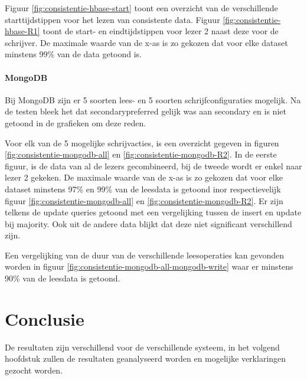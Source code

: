 Figuur \ref{fig:consistentie-hbase-start} toont een overzicht van de verschillende starttijdstippen voor het lezen van consistente data. Figuur \ref{fig:consistentie-hbase-R1} toont de start- en eindtijdstippen voor lezer 2 naast deze voor de schrijver. De maximale waarde van de x-as is zo gekozen dat voor elke dataset minstens 99\% van de data getoond is. 



\paragraph{MongoDB} Bij MongoDB zijn er 5 soorten lees- en 5 soorten schrijfconfiguraties mogelijk. Na de testen bleek het dat secondarypreferred gelijk was aan secondary en is niet getoond in de grafieken om deze reden. 

Voor elk van de 5 mogelijke schrijvacties, is een overzicht gegeven in figuren \ref{fig:consistentie-mongodb-all} en \ref{fig:consistentie-mongodb-R2}. In de eerste figuur, is de data van al de lezers gecombineerd, bij de tweede wordt er enkel naar lezer 2 gekeken. De maximale waarde van de x-as is zo gekozen dat voor elke dataset minstens 97\% en 99\% van de leesdata is getoond inor respectievelijk figuur \ref{fig:consistentie-mongodb-all} en \ref{fig:consistentie-mongodb-R2}. Er zijn telkens de update queries getoond met een vergelijking tussen de insert en update bij majority. Ook uit de andere data blijkt dat deze niet significant verschillend zijn. 

Een vergelijking van de duur van de verschillende leesoperaties kan gevonden worden in figuur \ref{fig:consistentie-mongodb-all-mongodb-write} waar er minstens 90\% van de leesdata is getoond. 


\section{Conclusie}
De resultaten zijn verschillend voor de verschillende systeem, in het volgend hoofdstuk zullen de resultaten geanalyseerd worden en mogelijke verklaringen gezocht worden. 
